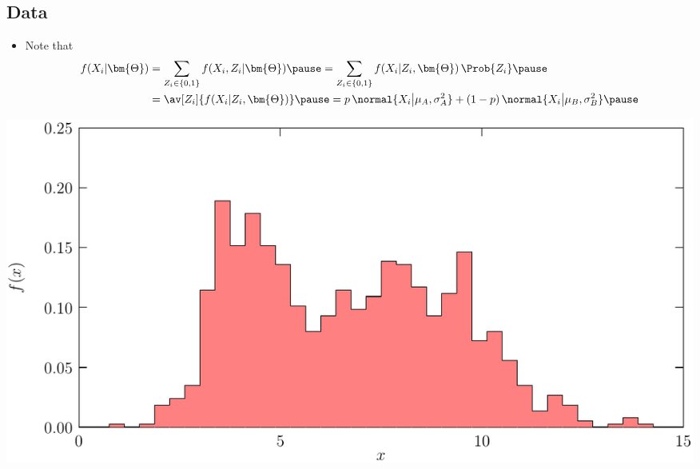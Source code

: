 \begin{slide}
\section[-2]{Data}

\begin{PauseHighLight}
  \begin{itemize}
  \item Note that{\small
    \begin{align*}
      f(X_i|\bm{\Theta})
      &= \sum_{Z_i\in\{0,1\}} f(X_i,Z_i|\bm{\Theta})\pause 
        = \sum_{Z_i\in\{0,1\}}
        f(X_i|Z_i,\bm{\Theta})\,\Prob{Z_i}\pause \\
      &= \av[Z_i]{f(X_i|Z_i,\bm{\Theta})}\pause
      = p \, \normal{X_i\big|\mu_A,\sigma_A^2} +
      (1-p)\,\normal{X_i\big|\mu_B,\sigma_B^2}\pause
    \end{align*}}
  \end{itemize}
  \begin{center}
    \includegraphics[width=0.8\linewidth]{mixtureOfGaussiansData}\pause
  \end{center}
\end{PauseHighLight}

\end{slide}


